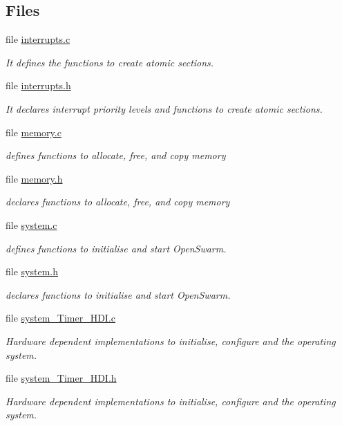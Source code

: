 \subsection*{Files}
\begin{DoxyCompactItemize}
\item 
file \hyperlink{interrupts_8c}{interrupts.\+c}
\begin{DoxyCompactList}\small\item\em It defines the functions to create atomic sections. \end{DoxyCompactList}\item 
file \hyperlink{interrupts_8h}{interrupts.\+h}
\begin{DoxyCompactList}\small\item\em It declares interrupt priority levels and functions to create atomic sections. \end{DoxyCompactList}\item 
file \hyperlink{memory_8c}{memory.\+c}
\begin{DoxyCompactList}\small\item\em defines functions to allocate, free, and copy memory \end{DoxyCompactList}\item 
file \hyperlink{memory_8h}{memory.\+h}
\begin{DoxyCompactList}\small\item\em declares functions to allocate, free, and copy memory \end{DoxyCompactList}\item 
file \hyperlink{system_8c}{system.\+c}
\begin{DoxyCompactList}\small\item\em defines functions to initialise and start Open\+Swarm. \end{DoxyCompactList}\item 
file \hyperlink{system_8h}{system.\+h}
\begin{DoxyCompactList}\small\item\em declares functions to initialise and start Open\+Swarm. \end{DoxyCompactList}\item 
file \hyperlink{system__Timer__HDI_8c}{system\+\_\+\+Timer\+\_\+\+H\+D\+I.\+c}
\begin{DoxyCompactList}\small\item\em Hardware dependent implementations to initialise, configure and the operating system. \end{DoxyCompactList}\item 
file \hyperlink{system__Timer__HDI_8h}{system\+\_\+\+Timer\+\_\+\+H\+D\+I.\+h}
\begin{DoxyCompactList}\small\item\em Hardware dependent implementations to initialise, configure and the operating system. \end{DoxyCompactList}\end{DoxyCompactItemize}


